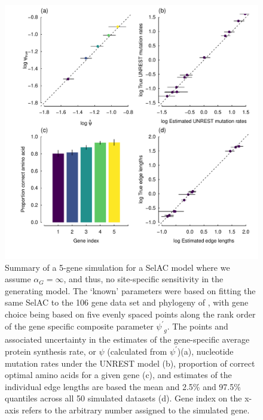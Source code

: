 \documentclass[12pt,letterpaper]{article}
\newcommand{\alphag}{\ensuremath{\alpha_G}\xspace}
\newcommand{\psiprime}{\ensuremath{\psi^\prime}\xspace}
\begin{document}
\begin{figure}[H]
  \centering
  \includegraphics[width=0.9\linewidth]{FIGURE_S3_5genes_ALL_UNREST_Selac_NoG.pdf}
  \caption{Summary of a 5-gene simulation for a SelAC model where we assume $\alphag = \infty$, and thus, no site-specific sensitivity in the generating model.
    The `known' parameters were based on fitting the same SelAC to the 106 gene data set and phylogeny of \citet{RokasEtAl2003}, with gene choice being based on five evenly spaced points along the rank order of the gene specific composite parameter $\psiprime_g$.
                The points and associated uncertainty in the estimates of the gene-specific average protein synthesis rate, or $\psi$ (calculated from $\psiprime$)(a), nucleotide mutation rates under the UNREST model (b), proportion of correct optimal amino acids for a given gene (c), and estimates of the individual edge lengths are based the mean and 2.5\% and 97.5\% quantiles across all 50 simulated datasets (d).
                Gene index on the x-axis refers to the arbitrary number assigned to the simulated gene.
}
  \label{fig:SelacNoGSimRes}
\end{figure}
\end{document}
